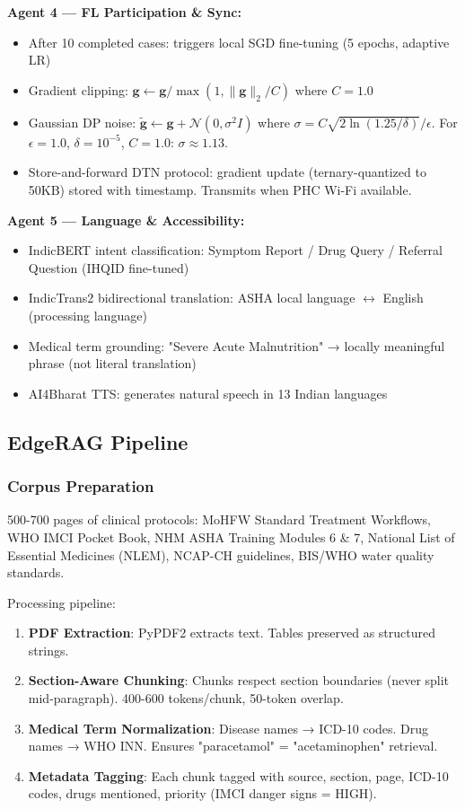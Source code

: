 \documentclass[conference,compsoc]{IEEEtran}
\begin{document}
\textbf{Agent 4 — FL Participation \& Sync:}
\begin{itemize}
    \item After 10 completed cases: triggers local SGD fine-tuning (5 epochs, adaptive LR)
    \item Gradient clipping: \(\mathbf{g} \leftarrow \mathbf{g} / \max(1, \|\mathbf{g}\|_2 / C)\) where \(C=1.0\)
    \item Gaussian DP noise: \(\tilde{\mathbf{g}} \leftarrow \mathbf{g} + \mathcal{N}(0, \sigma^2 I)\) where \(\sigma = C \sqrt{2\ln(1.25/\delta)} / \epsilon\). For \(\epsilon=1.0\), \(\delta=10^{-5}\), \(C=1.0\): \(\sigma \approx 1.13\).
    \item Store-and-forward DTN protocol: gradient update (ternary-quantized to 50KB) stored with timestamp. Transmits when PHC Wi-Fi available.
\end{itemize}

\textbf{Agent 5 — Language \& Accessibility:}
\begin{itemize}
    \item IndicBERT intent classification: Symptom Report / Drug Query / Referral Question (IHQID fine-tuned)
    \item IndicTrans2 bidirectional translation: ASHA local language \(\leftrightarrow\) English (processing language)
    \item Medical term grounding: "Severe Acute Malnutrition" → locally meaningful phrase (not literal translation)
    \item AI4Bharat TTS: generates natural speech in 13 Indian languages
\end{itemize}

\subsection{EdgeRAG Pipeline}

\subsubsection{Corpus Preparation}
500-700 pages of clinical protocols: MoHFW Standard Treatment Workflows, WHO IMCI Pocket Book, NHM ASHA Training Modules 6 \& 7, National List of Essential Medicines (NLEM), NCAP-CH guidelines, BIS/WHO water quality standards.

Processing pipeline:
\begin{enumerate}
    \item \textbf{PDF Extraction}: PyPDF2 extracts text. Tables preserved as structured strings.
    \item \textbf{Section-Aware Chunking}: Chunks respect section boundaries (never split mid-paragraph). 400-600 tokens/chunk, 50-token overlap.
    \item \textbf{Medical Term Normalization}: Disease names → ICD-10 codes. Drug names → WHO INN. Ensures "paracetamol" = "acetaminophen" retrieval.
    \item \textbf{Metadata Tagging}: Each chunk tagged with source, section, page, ICD-10 codes, drugs mentioned, priority (IMCI danger signs = HIGH).
\end{enumerate}
\end{document}
